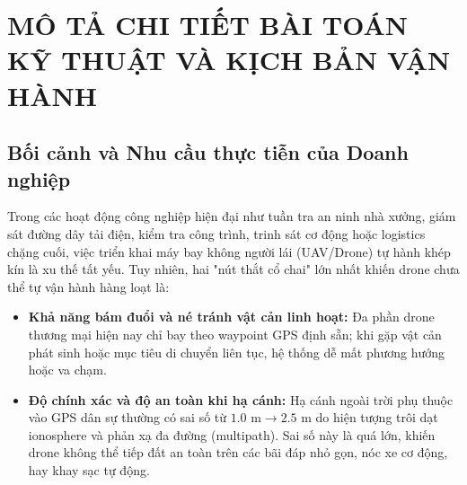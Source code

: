 \documentclass[12pt,a4paper]{article}
\begin{document}
\newpage

\section{MÔ TẢ CHI TIẾT BÀI TOÁN KỸ THUẬT VÀ KỊCH BẢN VẬN HÀNH}

\subsection{Bối cảnh và Nhu cầu thực tiễn của Doanh nghiệp}
Trong các hoạt động công nghiệp hiện đại như tuần tra an ninh nhà xưởng, giám sát đường dây tải điện, kiểm tra công trình, trinh sát cơ động hoặc logistics chặng cuối, việc triển khai máy bay không người lái (UAV/Drone) tự hành khép kín là xu thế tất yếu. Tuy nhiên, hai "nút thắt cổ chai" lớn nhất khiến drone chưa thể tự vận hành hàng loạt là:
\begin{itemize}[noitemsep,topsep=2pt]
    \item \textbf{Khả năng bám đuổi và né tránh vật cản linh hoạt:} Đa phần drone thương mại hiện nay chỉ bay theo waypoint GPS định sẵn; khi gặp vật cản phát sinh hoặc mục tiêu di chuyển liên tục, hệ thống dễ mất phương hướng hoặc va chạm.
    \item \textbf{Độ chính xác và độ an toàn khi hạ cánh:} Hạ cánh ngoài trời phụ thuộc vào GPS dân sự thường có sai số từ $1.0\text{ m} \to 2.5\text{ m}$ do hiện tượng trôi dạt ionosphere và phản xạ đa đường (multipath). Sai số này là quá lớn, khiến drone không thể tiếp đất an toàn trên các bãi đáp nhỏ gọn, nóc xe cơ động, hay khay sạc tự động.
\end{itemize}
\end{document}
